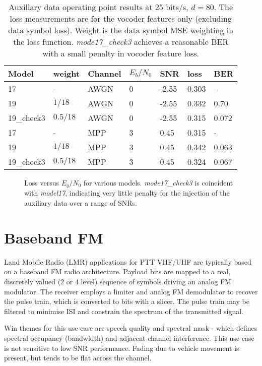 \documentclass{article}
\begin{document}
\begin{table} [H]
\centering
\begin{tabular}{ l | l | l | l | l | l | l}
 \hline
 Model & weight & Channel & $E_b/N_0$ & SNR & loss & BER \\
 \hline
 17 & - & AWGN & 0 & -2.55 & 0.303 & - \\
 19 & $1/18$ & AWGN & 0 & -2.55 & 0.332 & 0.70 \\
 19\_check3 & $0.5/18$ & AWGN & 0 & -2.55 & 0.315 & 0.072 \\
 17 & - & MPP & 3 & 0.45 & 0.315 & - \\
 19 & $1/18$ & MPP & 3 & 0.45 & 0.342 & 0.063 \\
 19\_check3 & $0.5/18$ & MPP & 3 & 0.45 & 0.324 & 0.067 \\
 \hline
\end{tabular}
\caption{Auxillary data operating point results at 25 bits/s, $d=80$. The loss measurements are for the vocoder features only (excluding data symbol loss). Weight is the data symbol MSE weighting in the loss function. \emph{mode17\_check3} achieves a reasonable BER with a small penalty in vocoder feature loss.}
\label{tab:acq_data}
\end{table}

\begin{figure}[H]
\caption{Loss versus $E_q/N_0$ for various models. \emph{mode17\_check3} is coincident with  \emph{model17}, indicating very little penalty for the injection of the auxiliary data over a range of SNRs.}
\label{fig:loss_eqno_models}
\begin{center}

\end{center}
\end{figure}

\section{Baseband FM}

Land Mobile Radio (LMR) applications for PTT VHF/UHF are typically based on a baseband FM radio architecture. Payload bits are mapped to a real, discretely valued (2 or 4 level) sequence of symbols driving an analog FM modulator.  The receiver employs a limiter and analog FM demodulator to recover the pulse train, which is converted to bits with a slicer.  The pulse train may be filtered to minimise ISI and constrain the spectrum of the transmitted signal.

Win themes for this use case are speech quality and spectral mask - which defines spectral occupancy (bandwidth) and adjacent channel interference. This use case is not sensitive to low SNR performance.  Fading due to vehicle movement is present, but tends to be flat across the channel.
\end{document}
